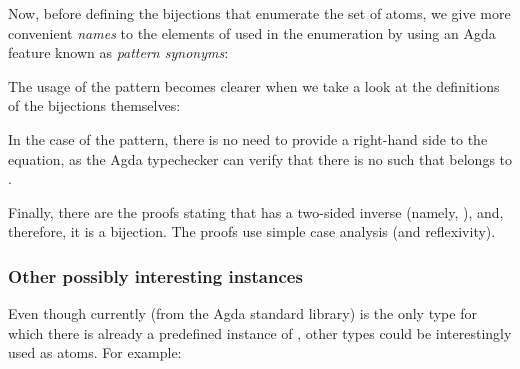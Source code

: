             \begin{center}
            \end{center}

            Now, before defining the bijections that enumerate the set of atoms,
            we give more convenient \emph{names} to the elements of   used in the enumeration
            by using an Agda feature known as \emph{pattern synonyms}:

            \begin{center}
            \end{center}

            The usage of the  pattern becomes clearer when we take a look at
            the definitions of the bijections themselves:

            \begin{center}
            \end{center}

            In the case of the  pattern, there is no need to provide a right-hand side
            to the equation, as the Agda typechecker can verify that
            there is no  such that  \AY{(} \AY{)} belongs to  .

            Finally, there are the proofs stating that  has a two-sided inverse (namely, ),
            and, therefore, it is a bijection. The proofs use simple case analysis (and reflexivity).

            \begin{center}
            \end{center}

            \subsubsection{Other possibly interesting instances}
            Even though currently  (from the Agda standard library) is the only type for which
            there is already a predefined instance of , other types could be interestingly used as atoms.
            For example:

